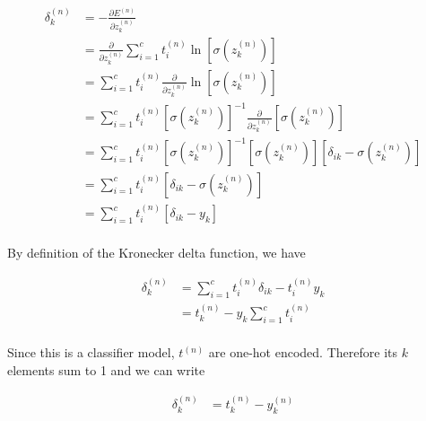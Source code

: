 \begin{enumerate}[label=(\alph*)]
\begin{tcolorbox}
\begin{tcolorbox}[title={Output Layer Derivation}]
			      \begin{align*}
				      \delta_k^{(n)} & = - \frac{\partial E^{(n)}}{\partial
				      z_k^{(n)}}                                                                                                                                                       \\
				                     & = \frac{\partial}{\partial z_k^{(n)}}
				      \sum_{i=1}^c t_i^{(n)} \ln \left[ \sigma(z_k^{(n)}) \right]                                                                                                      \\
				                     & =  \sum_{i=1}^c t_i^{(n)} \frac{\partial}{\partial z_k^{(n)}} \ln \left[ \sigma(z_k^{(n)}) \right]                                              \\
				                     & =  \sum_{i=1}^c t_i^{(n)} \left[ \sigma(z_k^{(n)}) \right]^{-1} \frac{\partial}{\partial z_k^{(n)}} \left[ \sigma(z_k^{(n)}) \right]            \\
				                     & =  \sum_{i=1}^c t_i^{(n)} \left[ \sigma(z_k^{(n)}) \right]^{-1} \left[ \sigma(z_k^{(n)}) \right] \left[ \delta_{ik} - \sigma(z_k^{(n)}) \right] \\
				                     & =  \sum_{i=1}^c t_i^{(n)} \left[ \delta_{ik} - \sigma(z_k^{(n)}) \right]                                                                        \\
				                     & =  \sum_{i=1}^c t_i^{(n)} \left[ \delta_{ik} - y_k \right]                                                                                      \\
			      \end{align*}

			      By definition of the Kronecker delta function, we have

			      \begin{align*}
				      \delta_k^{(n)} & =  \sum_{i=1}^c t_i^{(n)}  \delta_{ik} - t_i^{(n)} y_k \\
				                     & =  t_k^{(n)}   - y_k \sum_{i=1}^c  t_i^{(n)}           \\
			      \end{align*}

			      Since this is a classifier model, $t^{(n)}$ are one-hot encoded.
			      Therefore its $k$ elements sum to 1 and we can write

			      \begin{align*}
				      \delta_k^{(n)} & =  t_k^{(n)}   - y_k^{(n)}
			      \end{align*}
		      \end{tcolorbox}
	      \end{tcolorbox}


\end{enumerate}
